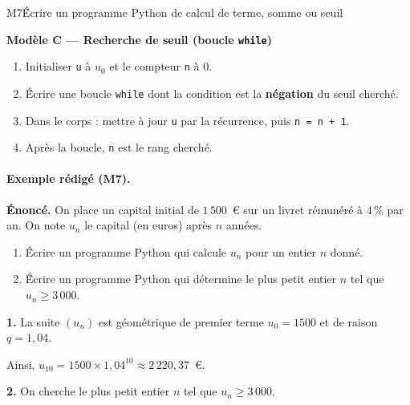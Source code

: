 \begin{fichemethode}{M7}{\'Écrire un programme Python de calcul de terme, somme ou seuil}
{\medskip
\textbf{Mod\`ele C --- Recherche de seuil (boucle \texttt{while})}
\begin{enumerate}
  \item Initialiser \texttt{u} \`a $u_0$ et le compteur \texttt{n} \`a $0$.
  \item \'Écrire une boucle \texttt{while} dont la condition est la \textbf{n\'egation} du seuil cherch\'e.
  \item Dans le corps : mettre \`a jour \texttt{u} par la r\'ecurrence, puis \texttt{n = n + 1}.
  \item Apr\`es la boucle, \texttt{n} est le rang cherch\'e.
\end{enumerate}
}

\end{fichemethode}

\paragraph{Exemple r\'edig\'e (M7).}

\textbf{\'Enonc\'e.} On place un capital initial de $1\,500$~\euro{} sur un livret r\'emun\'er\'e \`a $4\,\%$ par an. On note $u_n$ le capital (en euros) apr\`es $n$ ann\'ees.

\begin{enumerate}
  \item \'Écrire un programme Python qui calcule $u_n$ pour un entier $n$ donn\'e.
  \item \'Écrire un programme Python qui d\'etermine le plus petit entier $n$ tel que $u_n \geq 3\,000$.
\end{enumerate}

\medskip
\textbf{1.} La suite $(u_n)$ est g\'eom\'etrique de premier terme $u_0 = 1500$ et de raison $q = 1{,}04$.




Ainsi, $u_{10} = 1500 \times 1{,}04^{10} \approx 2\,220{,}37$~\euro.

\medskip
\textbf{2.} On cherche le plus petit entier $n$ tel que $u_n \geq 3\,000$.


